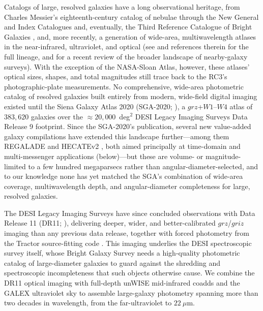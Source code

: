 \documentclass[modern,linenumbers]{aastex701}
\begin{document}
Catalogs of large, resolved galaxies have a long observational heritage, from
Charles Messier's eighteenth-century catalog of nebulae through the New
General and Index Catalogues and, eventually, the Third Reference Catalogue
of Bright Galaxies \citep[RC3;][]{de-vaucouleurs91a}, and, more recently, a
generation of wide-area, multiwavelength atlases in the near-infrared,
ultraviolet, and optical (see \citealt{moustakas23a} and references therein
for the full lineage, and \citealt{christie24a} for a recent review of the
broader landscape of nearby-galaxy surveys). With the exception of the
NASA-Sloan Atlas, however, these atlases' optical sizes, shapes, and total
magnitudes still trace back to the RC3's photographic-plate measurements.
No comprehensive, wide-area photometric catalog of resolved galaxies built
entirely from modern, wide-field digital imaging existed until the Siena
Galaxy Atlas 2020 (SGA-2020; \citealt{moustakas23a}), a $grz$+$W1$--$W4$
atlas of $383{,}620$ galaxies over the $\approx\!20{,}000$~deg$^2$ DESI
Legacy Imaging Surveys Data Release 9 footprint. Since the SGA-2020's
publication, several new value-added galaxy compilations have extended
this landscape further---among them REGALADE \citep{tranin26a} and
HECATEv2 \citep{kyritsis26a}, both aimed principally at time-domain and
multi-messenger applications (below)---but these are volume- or
magnitude-limited to a few hundred megaparsecs rather than
angular-diameter-selected, and to our knowledge none has yet matched the
SGA's combination of wide-area coverage, multiwavelength depth, and
angular-diameter completeness for large, resolved galaxies.

The DESI Legacy Imaging Surveys have since concluded observations with
Data Release 11 (DR11; \citealt{dey19a}), delivering deeper, wider, and
better-calibrated $grz$/$griz$ imaging than any previous data release,
together with forced photometry from the Tractor source-fitting code
\citep{lang16a}. This imaging underlies the DESI spectroscopic survey
itself, whose Bright Galaxy Survey needs a high-quality photometric
catalog of large-diameter galaxies to guard against the shredding and
spectroscopic incompleteness that such objects otherwise cause. We
combine the DR11 optical imaging with full-depth unWISE mid-infrared
coadds \citep{lang14a, meisner21a} and the GALEX ultraviolet sky
\citep{martin05a} to assemble large-galaxy photometry spanning more than
two decades in wavelength, from the far-ultraviolet to $22~\mu$m.
\end{document}
